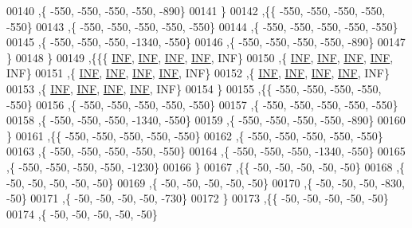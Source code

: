 \begin{DoxyCode}
00140   ,\{  -550,  -550,  -550,  -550,  -890\}
00141   \}
00142  ,\{\{  -550,  -550,  -550,  -550,  -550\}
00143   ,\{  -550,  -550,  -550,  -550,  -550\}
00144   ,\{  -550,  -550,  -550,  -550,  -550\}
00145   ,\{  -550,  -550,  -550, -1340,  -550\}
00146   ,\{  -550,  -550,  -550,  -550,  -890\}
00147   \}
00148  \}
00149 ,\{\{\{   \hyperlink{constants_8h_a12c2040f25d8e3a7b9e1c2024c618cb6}{INF},   \hyperlink{constants_8h_a12c2040f25d8e3a7b9e1c2024c618cb6}{INF},   \hyperlink{constants_8h_a12c2040f25d8e3a7b9e1c2024c618cb6}{INF},   \hyperlink{constants_8h_a12c2040f25d8e3a7b9e1c2024c618cb6}{INF},   INF\}
00150   ,\{   \hyperlink{constants_8h_a12c2040f25d8e3a7b9e1c2024c618cb6}{INF},   \hyperlink{constants_8h_a12c2040f25d8e3a7b9e1c2024c618cb6}{INF},   \hyperlink{constants_8h_a12c2040f25d8e3a7b9e1c2024c618cb6}{INF},   \hyperlink{constants_8h_a12c2040f25d8e3a7b9e1c2024c618cb6}{INF},   INF\}
00151   ,\{   \hyperlink{constants_8h_a12c2040f25d8e3a7b9e1c2024c618cb6}{INF},   \hyperlink{constants_8h_a12c2040f25d8e3a7b9e1c2024c618cb6}{INF},   \hyperlink{constants_8h_a12c2040f25d8e3a7b9e1c2024c618cb6}{INF},   \hyperlink{constants_8h_a12c2040f25d8e3a7b9e1c2024c618cb6}{INF},   INF\}
00152   ,\{   \hyperlink{constants_8h_a12c2040f25d8e3a7b9e1c2024c618cb6}{INF},   \hyperlink{constants_8h_a12c2040f25d8e3a7b9e1c2024c618cb6}{INF},   \hyperlink{constants_8h_a12c2040f25d8e3a7b9e1c2024c618cb6}{INF},   \hyperlink{constants_8h_a12c2040f25d8e3a7b9e1c2024c618cb6}{INF},   INF\}
00153   ,\{   \hyperlink{constants_8h_a12c2040f25d8e3a7b9e1c2024c618cb6}{INF},   \hyperlink{constants_8h_a12c2040f25d8e3a7b9e1c2024c618cb6}{INF},   \hyperlink{constants_8h_a12c2040f25d8e3a7b9e1c2024c618cb6}{INF},   \hyperlink{constants_8h_a12c2040f25d8e3a7b9e1c2024c618cb6}{INF},   INF\}
00154   \}
00155  ,\{\{  -550,  -550,  -550,  -550,  -550\}
00156   ,\{  -550,  -550,  -550,  -550,  -550\}
00157   ,\{  -550,  -550,  -550,  -550,  -550\}
00158   ,\{  -550,  -550,  -550, -1340,  -550\}
00159   ,\{  -550,  -550,  -550,  -550,  -890\}
00160   \}
00161  ,\{\{  -550,  -550,  -550,  -550,  -550\}
00162   ,\{  -550,  -550,  -550,  -550,  -550\}
00163   ,\{  -550,  -550,  -550,  -550,  -550\}
00164   ,\{  -550,  -550,  -550, -1340,  -550\}
00165   ,\{  -550,  -550,  -550,  -550, -1230\}
00166   \}
00167  ,\{\{   -50,   -50,   -50,   -50,   -50\}
00168   ,\{   -50,   -50,   -50,   -50,   -50\}
00169   ,\{   -50,   -50,   -50,   -50,   -50\}
00170   ,\{   -50,   -50,   -50,  -830,   -50\}
00171   ,\{   -50,   -50,   -50,   -50,  -730\}
00172   \}
00173  ,\{\{   -50,   -50,   -50,   -50,   -50\}
00174   ,\{   -50,   -50,   -50,   -50,   -50\}

\end{DoxyCode}
